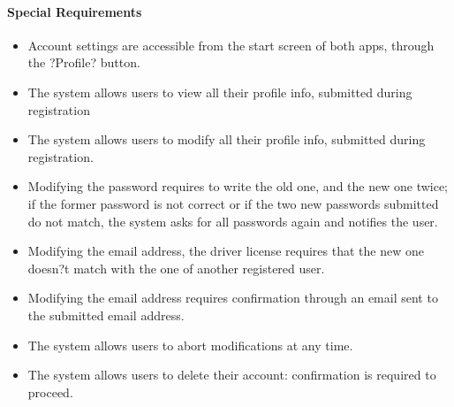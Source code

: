 \paragraph{Special Requirements}
\begin{itemize}
	\item Account settings are accessible from the start screen of both apps, through the ?Profile? button.
	\item The system allows users to view all their profile info, submitted during registration
	\item The system allows users to modify all their profile info, submitted during registration.
	\item Modifying the password requires to write the old one, and the new one twice; if the former password is not correct or if the two new passwords submitted do not match, the system asks for all passwords again and notifies the user.
	\item Modifying the email address, the driver license requires that the new one doesn?t match with the one of another registered user.
	\item Modifying the email address requires confirmation through an email sent to the submitted email address.
	\item The system allows users to abort modifications at any time.
	\item The system allows users to delete their account: confirmation is required to proceed.
\end{itemize}
